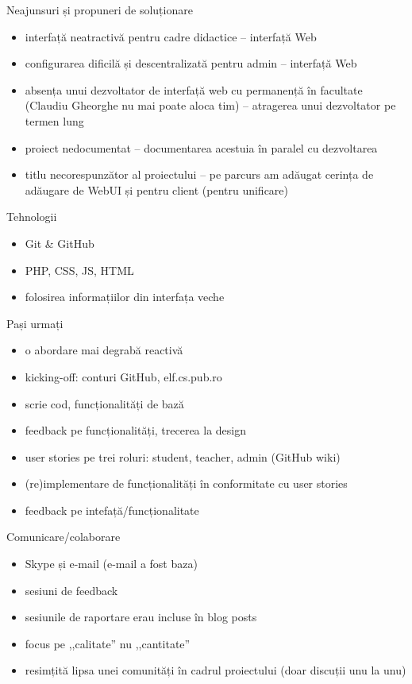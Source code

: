 \documentclass{simple}
\begin{document}
\begin{frame}{Neajunsuri și propuneri de soluționare}
  \begin{itemize}
    \item interfață neatractivă pentru cadre didactice -- interfață Web
    \item configurarea dificilă și descentralizată pentru admin -- interfață
      Web
    \item absența unui dezvoltator de interfață web cu permanență în
      facultate (Claudiu Gheorghe nu mai poate aloca tim) -- atragerea unui
      dezvoltator pe termen lung
    \item proiect nedocumentat -- documentarea acestuia în paralel cu
      dezvoltarea
    \item titlu necorespunzător al proiectului -- pe parcurs am adăugat
      cerința de adăugare de WebUI și pentru client (pentru unificare)
  \end{itemize}
\end{frame}

\begin{frame}{Tehnologii}
  \begin{itemize}
    \item Git \& GitHub
    \item PHP, CSS, JS, HTML
    \item folosirea informațiilor din interfața veche
  \end{itemize}
\end{frame}

\begin{frame}{Pași urmați}
  \begin{itemize}
    \item o abordare mai degrabă reactivă
    \item kicking-off: conturi GitHub, elf.cs.pub.ro
    \item scrie cod, funcționalități de bază
    \item feedback pe funcționalități, trecerea la design
    \item user stories pe trei roluri: student, teacher, admin (GitHub wiki)
    \item (re)implementare de funcționalități în conformitate cu user stories
    \item feedback pe intefață/funcționalitate
  \end{itemize}
\end{frame}

\begin{frame}{Comunicare/colaborare}
  \begin{itemize}
    \item Skype și e-mail (e-mail a fost baza)
    \item sesiuni de feedback
    \item sesiunile de raportare erau incluse în blog posts
    \item focus pe ,,calitate'' nu ,,cantitate''
    \item resimțită lipsa unei comunități în cadrul proiectului (doar discuții
      unu la unu)
  \end{itemize}
\end{frame}
\end{document}
